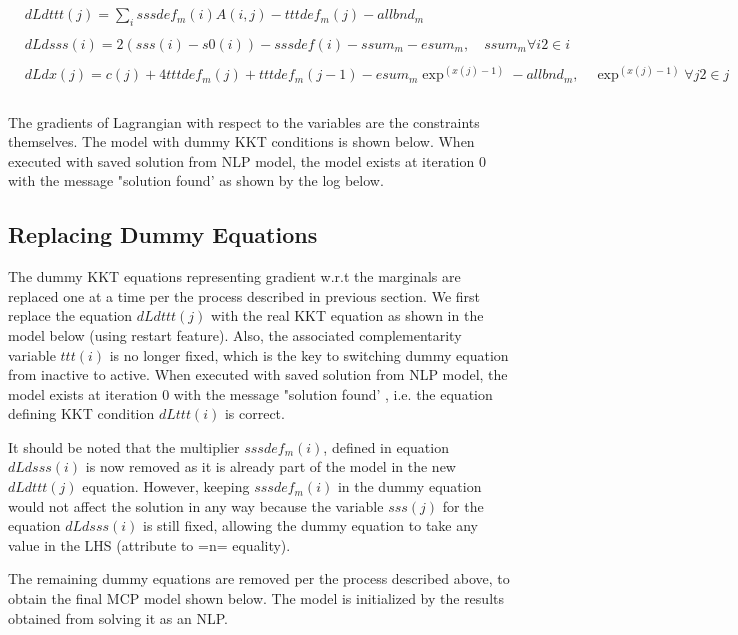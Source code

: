 \documentclass{article}
\begin{document}
\begin{equation}
\begin{aligned}
\\
& dLdttt(j) =  \sum_{i} sssdef_m(i)A(i,j) -  tttdef_m(j)  - allbnd_m \\
\\
& dLdsss(i) = 2(sss(i) - s0(i)) - sssdef(i)  -  ssum_m -  esum_m  , \quad ssum_m \forall i2 \in i \\
\\
& dLdx(j) = c(j) + 4tttdef_m(j) + tttdef_m(j-1) - esum_m \exp^{(x(j)-1)} - allbnd_m , \quad \exp^{(x(j)-1)}  \forall j2 \in j \\
\\
\end{aligned}
\end{equation}

The gradients of Lagrangian with respect to the variables are the constraints themselves.
The model with dummy KKT conditions is shown below. When executed with saved solution from NLP model, the model exists at iteration 0 with the message
"solution found' as shown by the log below.




\subsection{Replacing Dummy Equations}

The dummy  KKT equations representing gradient w.r.t the marginals are replaced one at a time per the process described in previous section.
We first replace the equation $dLdttt(j)$ with the real KKT equation as shown in the model below (using restart feature). Also, the associated complementarity
variable $ttt(i)$ is no longer fixed, which is the key to switching dummy equation from inactive to active. When executed with saved solution from NLP model,
the model exists at iteration 0 with the message "solution found' , i.e. the equation defining KKT condition $dLttt(i)$ is correct.

It should be noted that the multiplier $sssdef_m(i)$, defined in equation $dLdsss(i)$ is now removed as it is already part of the model
in the new $dLdttt(j)$ equation. However, keeping $sssdef_m(i)$ in the dummy equation would not affect the solution in any way because the variable
$sss(j)$ for the equation $dLdsss(i)$ is still fixed, allowing the dummy equation to take any value in the LHS (attribute to =n= equality).




The remaining dummy equations are removed per the process described above, to obtain the final MCP model shown below. The model is initialized
by the results obtained from solving it as an NLP.



\end{document}
